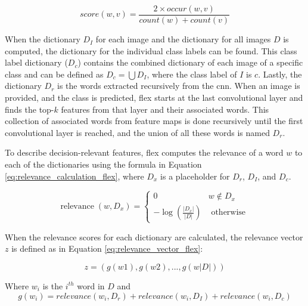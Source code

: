         \begin{equation}
            \textit{score}(w, v) = \frac{2 \times \textit{occur}(w, v)}{\textit{count}(w) + \textit{count}(v)}
        \label{eq:dice_score_flex}
        \end{equation}

        When the dictionary $D_I$ for each image and the dictionary for all images $D$ is computed, the dictionary for the individual class labels can be found. This class label dictionary ($D_c$) contains the combined dictionary of each image of a specific class and can be defined as $D_c = \bigcup D_I$, where the class label of $I$ is $c$. 
        Lastly, the dictionary $D_r$ is the words extracted recursively from the \gls{cnn}. When an image is provided, and the class is predicted, \gls{flex} starts at the last convolutional layer and finds the top-$k$ features from that layer and their associated words. This collection of associated words from feature maps is done recursively until the first convolutional layer is reached, and the union of all these words is named $D_r$.


        To describe decision-relevant features, \gls{flex} computes the relevance of a word $w$ to each of the dictionaries using the formula in Equation \ref{eq:relevance_calculation_flex}, where $D_x$ is a placeholder for $D_r$, $D_I$, and $D_c$.

        \begin{equation}
            \operatorname{relevance}\left(w, D_x\right)=\left\{\begin{array}{cl}
            0 & w \notin D_x \\
            -\log \left(\frac{\left|D_x\right|}{|D|}\right) & \text { otherwise }
            \end{array}\right.
            \label{eq:relevance_calculation_flex}
        \end{equation}

        When the relevance scores for each dictionary are calculated, the relevance vector $z$ is defined as in Equation \ref{eq:relevance_vector_flex}:

        \begin{equation}
            z = (g(w1), g(w2), ..., g(w\left|D\right|))
        \label{eq:relevance_vector_flex}
        \end{equation}

        Where $w_i$ is the $i^{th}$ word in $D$ and
        \begin{equation*}
            g(w_i) = relevance(w_i, D_r) + relevance(w_i, D_I ) + relevance(w_i, D_c)
        \end{equation*}
  

